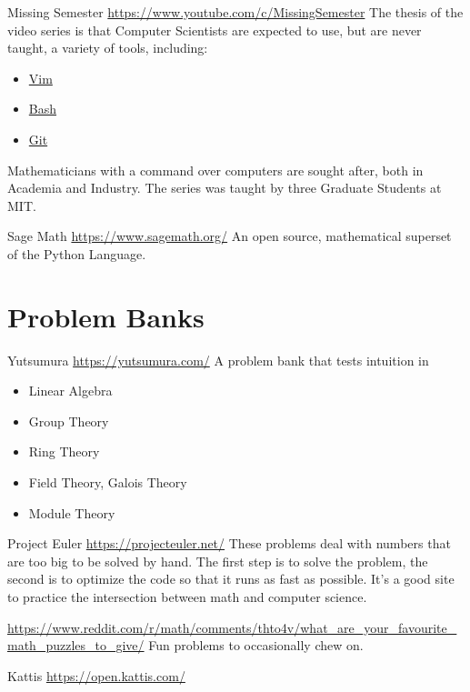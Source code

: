 %
\begin{boxResource}{Missing Semester}
\url{https://www.youtube.com/c/MissingSemester}
\tcblower
The thesis of the video series is that Computer Scientists are expected to use,
    but are never taught,
    a variety of tools,
    including:
\begin{itemize}
    \item \href{https://www.youtube.com/watch?v=a6Q8Na575qc}{Vim}
    \item \href{https://www.youtube.com/watch?v=Z56Jmr9Z34Q}{Bash}
    \item \href{https://www.youtube.com/watch?v=2sjqTHE0zok}{Git}
\end{itemize}
Mathematicians with a command over computers are sought after, both in Academia and Industry.
The series was taught by three Graduate Students at MIT.
\end{boxResource}
%
\begin{boxResource}{Sage Math}
\url{https://www.sagemath.org/}
\tcblower
An open source, mathematical superset of the Python Language.
\end{boxResource}
%
\section{Problem Banks}
\begin{boxResource}{Yutsumura}
\url{https://yutsumura.com/}
\tcblower
A problem bank that tests intuition in 
\begin{itemize}
    \item Linear Algebra
    \item Group Theory
    \item Ring Theory
    \item Field Theory, Galois Theory
    \item Module Theory
\end{itemize}

\end{boxResource}
%
\begin{boxResource}{Project Euler}
\url{https://projecteuler.net/}
\tcblower
These problems deal with numbers that are too big to be solved by hand.
The first step is to solve the problem,
    the second is to optimize the code so that it runs as fast as possible.
It's a good site to practice the intersection between math and computer science.
\end{boxResource}
\begin{boxResource}{}
\url{https://www.reddit.com/r/math/comments/thto4v/what_are_your_favourite_math_puzzles_to_give/}
\tcblower
Fun problems to occasionally chew on.
\end{boxResource}
\begin{boxResource}{Kattis}
\url{https://open.kattis.com/}
\tcblower
\end{boxResource}
